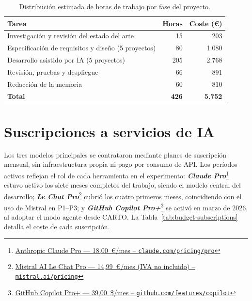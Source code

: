 \begin{table}[H]
\centering
\small
\renewcommand{\arraystretch}{1.3}
\begin{tabularx}{\textwidth}{|>{\raggedright\arraybackslash}X|r|r|}
\hline
\textbf{Tarea} & \textbf{Horas} & \textbf{Coste (€)} \\
\hline
Investigación y revisión del estado del arte & 15 & 203 \\
\hline
Especificación de requisitos y diseño (5 proyectos) & 80 & 1.080 \\
\hline
Desarrollo asistido por \ac{IA} (5 proyectos) & 205 & 2.768 \\
\hline
Revisión, pruebas y despliegue & 66 & 891 \\
\hline
Redacción de la memoria & 60 & 810 \\
\hline
\textbf{Total} & \textbf{426} & \textbf{5.752} \\
\hline
\end{tabularx}
\caption{Distribución estimada de horas de trabajo por fase del proyecto.}
\label{tab:budget-hours}
\end{table}

\section{Suscripciones a servicios de IA} \label{sec:budget-subscriptions}

Los tres modelos principales se contrataron mediante planes de suscripción mensual, sin infraestructura propia ni pago por consumo de \ac{API}. Los períodos activos reflejan el rol de cada herramienta en el experimento: \textbf{\textit{Claude Pro}}\footnote{\href{https://claude.com/pricing/pro}{Anthropic Claude Pro --- 18,00~€/mes -- \texttt{claude.com/pricing/pro}}} estuvo activo los siete meses completos del trabajo, siendo el modelo central del desarrollo; \textbf{\textit{Le Chat Pro}}\footnote{\href{https://mistral.ai/pricing}{Mistral AI Le Chat Pro --- 14,99~€/mes (IVA no incluido) -- \texttt{mistral.ai/pricing}}} cubrió los cuatro primeros meses, coincidiendo con el uso de Mistral en P1--P3; y \textbf{\textit{GitHub Copilot Pro+}}\footnote{\href{https://github.com/features/copilot}{GitHub Copilot Pro+ --- 39,00~\$/mes -- \texttt{github.com/features/copilot}}} se activó en marzo de 2026, al adoptar el modo agente desde \ac{CARTO}. La Tabla~\ref{tab:budget-subscriptions} detalla el coste de cada suscripción.

